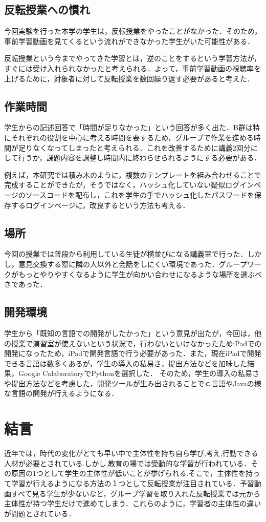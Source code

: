 \documentclass[a4j,11pt]{jsarticle}
\begin{document}
\subsection{反転授業への慣れ}
今回実験を行った本学の学生は，反転授業をやったことがなかった．そのため，事前学習動画を見てくるという流れができなかった学生がいた可能性がある．

反転授業という今までやってきた学習とは，逆のことをするという学習方法が，すぐには受け入れられなかったと考えられる．よって，事前学習動画の視聴率を上げるために，対象者に対して反転授業を数回繰り返す必要があると考えた．
\subsection{作業時間}
学生からの記述回答で「時間が足りなかった」という回答が多く出た．B群は特にそれぞれの役割を中心に考える時間を要するため，グループで作業を進める時間が足りなくなってしまったと考えられる．これを改善するために講義2回分にして行うか，課題内容を調整し時間内に終わらせられるようにする必要がある．

例えば，本研究では積み木のように，複数のテンプレートを組み合わせることで完成することができたが，そうではなく，ハッシュ化していない疑似ログインページのソースコードを配布し，これを学生の手でハッシュ化したパスワードを保存するログインページに，改良するという方法も考える．

\subsection{場所}
今回の授業では普段から利用している生徒が横並びになる講義室で行った．しかし，意見交換する際に隣の人以外と会話をしにくい環境であった．グループワークがもっとやりやすくなるように学生が向かい合わせになるような場所を選ぶべきであった．

\subsection{開発環境}
学生から「既知の言語での開発がしたかった」という意見が出たが，今回は，他の授業で演習室が使えないという状況で，行わないといけなかったためiPadでの開発になったため，iPadで開発言語で行う必要があった．また，現在iPadで開発できる言語は数多くあるが，学生の導入の私易さ，提出方法などを加味した結果，Google ColaboratoryでPythonを選択した．
そのため，学生の導入の私易さや提出方法などを考慮した，開発ツールが生み出されることでｃ言語やJavaの様な言語の開発が行えるようになる．



\newpage
\section{結言}
近年では，時代の変化がとても早い中で主体性を持ち自ら学び,考え,行動できる人材が必要とされている.しかし,教育の場では受動的な学習が行われている．その原因の1つとして学生の主体性が低いことが挙げられる.そこで，主体性を持って学習が行えるようになる方法の１つとして反転授業が注目されている．予習動画すべて見る学生が少ないなど，グループ学習を取り入れた反転授業では元から主体性が持つ学生だけで進めてしまう．これらのように，学習者の主体性の違いが問題とされている．
\end{document}
